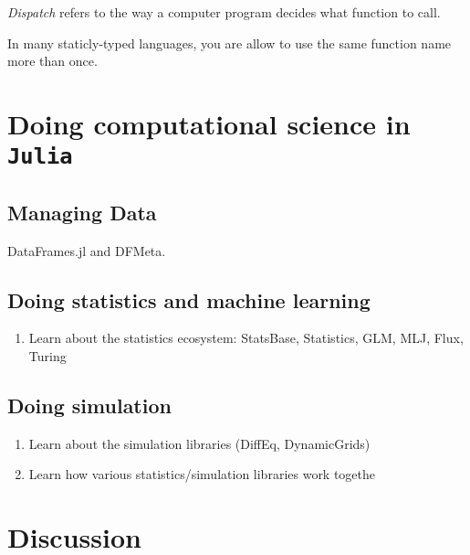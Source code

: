 \documentclass[11pt]{article}
\begin{document}
\emph{Dispatch} refers to the way a computer program decides what
function to call.

In many staticly-typed languages, you are allow to use the same function
name more than once.

\hypertarget{doing-computational-science-in-julia}{%
\section{\texorpdfstring{Doing computational science in
\texttt{Julia}}{Doing computational science in Julia}}\label{doing-computational-science-in-julia}}

\hypertarget{managing-data}{%
\subsection{Managing Data}\label{managing-data}}

DataFrames.jl and DFMeta.

\hypertarget{doing-statistics-and-machine-learning}{%
\subsection{Doing statistics and machine
learning}\label{doing-statistics-and-machine-learning}}

\begin{enumerate}
\def\labelenumi{\arabic{enumi}.}
\setcounter{enumi}{6}
\tightlist
\item
  Learn about the statistics ecosystem: StatsBase, Statistics, GLM, MLJ,
  Flux, Turing
\end{enumerate}

\hypertarget{doing-simulation}{%
\subsection{Doing simulation}\label{doing-simulation}}

\begin{enumerate}
\def\labelenumi{\arabic{enumi}.}
\setcounter{enumi}{7}
\tightlist
\item
  Learn about the simulation libraries (DiffEq, DynamicGrids)
\item
  Learn how various statistics/simulation libraries work togethe
\end{enumerate}

\hypertarget{discussion}{%
\section{Discussion}\label{discussion}}
\end{document}
